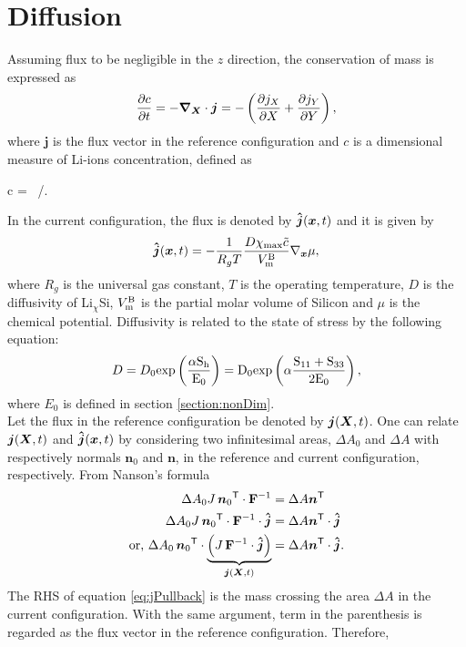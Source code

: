 \section{Diffusion}
Assuming flux to be negligible in the $z$ direction, the conservation of mass is expressed as
\begin{gather}
    \frac{\partial c}{\partial t} = - \bm{\nabla}_{\bm{X}} \cdot \bm{j} = -\left(\frac{\partial j_X}{\partial X} + \frac{\partial j_Y}{\partial Y}\right),
\end{gather}
where $\bm{j}$ is the flux vector in the reference configuration and $c$ is a dimensional measure of Li-ions concentration, defined as 
\begin{nonumbereq}
 c = \tc \, \xmax/\vmb.
\end{nonumbereq}
In the current configuration, the flux is denoted by $\bm{\hat{j}}({\bm{x}}, t)$ and it is given by \citep{2008JMPSHong}
\begin{gather}
    \bm{\hat{j}}({\bm{x}}, t) = -\frac{1}{R_g T} \frac{D \chi_{{\rm{max}}} \tilde{c}}{V_{\rm{m}}^{\rm{B}}} \nabla_{{\bm{x}}} \mu,
\end{gather} 
where $R_g$ is the universal gas constant, $T$ is the operating temperature, $D$ is the diffusivity of Li$_{\chi}$Si, $V_{\rm{m}}^{\rm{B}}$ is the partial molar volume of Silicon and $\mu$ is the chemical potential. Diffusivity is related to the state of stress by the following equation:
\begin{gather} 
 D = D_0 \rm{exp}\left(\frac{\alpha S_h}{E_0}\right) = D_0 \rm{exp}\left(\alpha \frac{{S}_{11}+{S}_{33}}{2 E_0}\right), 
\end{gather}
where $E_0$ is defined in section \ref{section:nonDim}. \\
Let the flux in the reference configuration be denoted by $\bm{j}({\bm{X}}, t)$. One can relate $\bm{j}({\bm{X}}, t)$ and $\bm{\hat{j}}({\bm{x}}, t)$ by considering two infinitesimal areas, $\Delta A_0$ and $\Delta A$ with respectively normals $\bm{n}_0$ and $\bm{n}$, in the reference and current configuration, respectively. From Nanson's formula 
\begin{align}
     \Delta A_0 J \, {\bm{n}_0}^{{\sf {T}}} \cdot \mathbf{F}^{-1} &= \Delta A {\bm{n}}^{{\sf {T}}} \nonumber \\
    \Delta A_0 J \, {\bm{n}_0}^{{\sf {T}}} \cdot \mathbf{F}^{-1} \cdot \bm{\hat{j}} &= \Delta A {\bm{n}}^{{\sf {T}}} \cdot \bm{\hat{j}} \nonumber \\
    \text{or, }\Delta A_0  \, {\bm{n}_0}^{{\sf {T}}} \cdot \underbrace{\left( J \, \mathbf{F}^{-1} \cdot \bm{\hat{j}} \right)}_{\bm{j}({\bm{X}}, t)} &= \Delta A {\bm{n}}^{{\sf {T}}} \cdot \bm{\hat{j}}. \label{eq:jPullback}
\end{align} The RHS of equation \ref{eq:jPullback} is the mass crossing the area $\Delta A$ in the current configuration. With the same argument, term in the parenthesis is regarded as the flux vector in the reference configuration. Therefore, 
